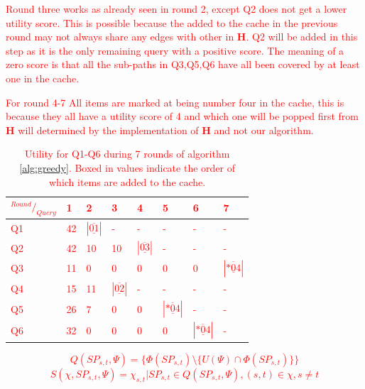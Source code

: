 \textcolor{red}{
Round three works as already seen in round 2, except Q2 does not get a lower utility score. This is possible because the \spath added to the cache in the previous round may not always share any edges with other \spaths in \textbf{H}. Q2 will be added in this step as it is the only remaining query with a positive score. The meaning of a zero score is that all the sub-paths in Q3,Q5,Q6 have all been covered by at least one \spath in the cache.
}

\textcolor{red}{
For round 4-7 All items are marked at being number four in the cache, this is because they all have a utility score of 4 and which one will be popped first from \textbf{H} will determined by the implementation of \textbf{H} and not our algorithm.
}


\begin{table}
\textcolor{red}{
\begin{tabular}{| l| l| l| l| l| l| l| l|}\hline
$^{Round}/_{Query}$ 	& 1 	& 2 		& 3 	& 4 	& 5 	& 6 	& 7\\\hline
Q1 			& 42 	& $| \underline{\overline{01}}|$	& -  		& -  	& -  	& -  & -  \\\hline
Q2 			& 42 	& 10	& 10	& $| \underline{\overline{03}} |$	& -	& - & -   \\\hline
Q3			& 11	& 0	& 0	& 0	& 0	& 0	& $| \underline{\overline{*04}} |$  \\\hline
Q4			& 15	& 11	& $| \underline{\overline{02}} |$ & -	& -	& -  & -  \\\hline
Q5			& 26	& 7	& 0	& 0	& $| \underline{\overline{*04}} |$ & -   & -  \\\hline
Q6			& 32	& 0	& 0	& 0	& 0	& $| \underline{\overline{*04}} |$ & -   \\\hline
\end{tabular}
}
\label{tab:steputil}
\caption{Utility for Q1-Q6 during 7 rounds of algorithm \ref{alg:greedy}. Boxed in values indicate the order of which items are added to the cache.}
\end{table}


\textcolor{red}{
\begin{equation} \label{eq:usp}
Q(SP_{s,t}, \Psi) = \{ \Phi(SP_{s,t}) \setminus \{ U(\Psi) \cap \Phi(SP_{s,t}) \} \}
\end{equation}
}
\textcolor{red}{
\begin{equation} \label{eq:score}
S(\chi, SP_{s,t}, \Psi) =  \chi_{s,t} | SP_{s,t} \in Q(SP_{s,t}, \Psi), (s,t) \in \chi, s \neq t
\end{equation}
}

